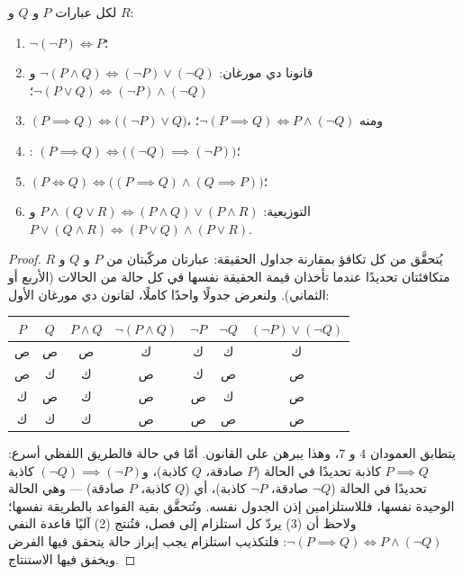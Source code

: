 \begin{proposition}\label{prop:b1:logic:rules}
لكل عبارات $P$ و $Q$ و $R$:
\begin{enumerate}
  \item $\lnot(\lnot P) \iff P$؛
  \item قانونا دي مورغان:
        $\lnot(P \land Q) \iff (\lnot P) \lor (\lnot Q)$ و
        $\lnot(P \lor Q) \iff (\lnot P) \land (\lnot Q)$؛
  \item $(P \implies Q) \iff \bigl((\lnot P) \lor Q\bigr)$، ومنه
        $\lnot(P \implies Q) \iff P \land (\lnot Q)$؛
  \item {}:
        $(P \implies Q) \iff \bigl((\lnot Q) \implies (\lnot P)\bigr)$؛
  \item $(P \iff Q) \iff \bigl((P \implies Q) \land (Q \implies
        P)\bigr)$؛
  \item التوزيعية: $P \land (Q \lor R) \iff (P \land Q) \lor
        (P \land R)$ و $P \lor (Q \land R) \iff (P \lor Q) \land
        (P \lor R)$.
\end{enumerate}
\end{proposition}

\begin{proof}
يُتحقَّق من كل تكافؤ بمقارنة جداول الحقيقة: عبارتان مركّبتان من $P$
و $Q$ و $R$ متكافئتان تحديدًا عندما تأخذان قيمة الحقيقة نفسها في كل
حالة من الحالات (الأربع أو الثماني). ولنعرض جدولًا واحدًا كاملًا،
لقانون دي مورغان الأول:
\begin{center}
\begin{tabular}{cc|c|c|cc|c}
$P$ & $Q$ & $P \land Q$ & $\lnot(P \land Q)$ & $\lnot P$ & $\lnot Q$ &
$(\lnot P) \lor (\lnot Q)$ \\
\hline
ص & ص & ص & ك & ك & ك & ك \\
ص & ك & ك & ص & ك & ص & ص \\
ك & ص & ك & ص & ص & ك & ص \\
ك & ك & ك & ص & ص & ص & ص \\
\end{tabular}
\end{center}
يتطابق العمودان $4$ و $7$، وهذا يبرهن على القانون. أمّا في حالة  فالطريق اللفظي أسرع:  $P \implies Q$ كاذبة تحديدًا في
الحالة ($P$ صادقة، $Q$ كاذبة)، و$(\lnot Q) \implies (\lnot P)$ كاذبة
تحديدًا في الحالة ($\lnot Q$ صادقة، $\lnot P$ كاذبة)، أي ($Q$
كاذبة، $P$ صادقة) --- وهي الحالة الوحيدة نفسها، فللاستلزامين إذن
الجدول نفسه. وتُتحقَّق بقية القواعد بالطريقة نفسها؛ ولاحظ أن (3)
يردّ كل استلزام إلى فصل، فتُنتج (2) آليًا قاعدة النفي
$\lnot(P \implies Q) \iff P
\land (\lnot Q)$: فلتكذيب استلزام يجب إبراز حالة يتحقق
فيها الفرض ويخفق فيها الاستنتاج.
\end{proof}

